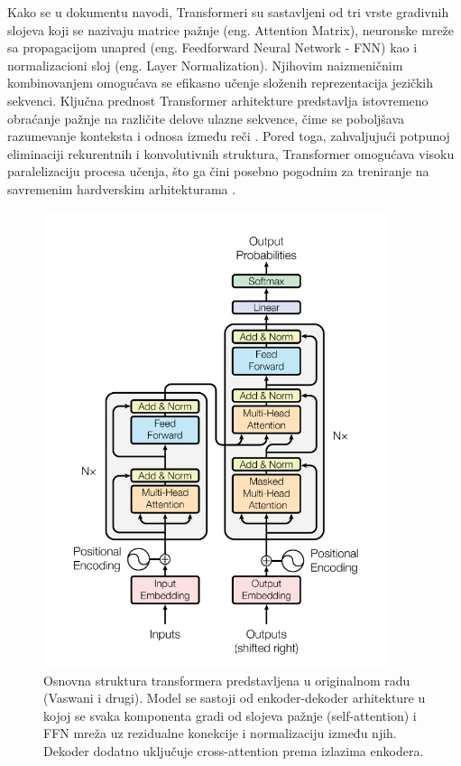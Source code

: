 \documentclass[12pt,oneside]{memoir}
\begin{document}
Kako se u dokumentu navodi, Transformeri su sastavljeni od tri vrste gradivnih slojeva koji se nazivaju matrice pažnje (eng. Attention Matrix), neuronske mreže sa propagacijom unapred (eng. Feedforward Neural Network - FNN) kao i normalizacioni sloj (eng. Layer Normalization).
Njihovim naizmeničnim kombinovanjem omogućava se efikasno učenje složenih reprezentacija jezičkih sekvenci. Ključna prednost Transformer arhitekture predstavlja istovremeno obraćanje pažnje na različite delove ulazne sekvence, čime se poboljšava razumevanje konteksta i odnosa između reči \cite{AttentionPaper}. Pored toga, zahvaljujući potpunoj eliminaciji rekurentnih i konvolutivnih struktura, Transformer omogućava visoku paralelizaciju procesa učenja, što ga čini posebno pogodnim za treniranje na savremenim hardverskim arhitekturama \cite{LLMScalingLaws}.

\begin{figure}[!ht]
	\centering
	\label{fig:TransformerExample}
	\includegraphics[width=0.9\textwidth]{Transformer_Example.png}
	\caption{Osnovna struktura transformera predstavljena u originalnom radu (Vaswani i drugi). Model se sastoji od enkoder-dekoder arhitekture u kojoj se svaka komponenta gradi od slojeva pažnje (self-attention) i FFN mreža uz rezidualne konekcije i normalizaciju između njih. Dekoder dodatno uključuje cross-attention prema izlazima enkodera.}
\end{figure}
\end{document}
